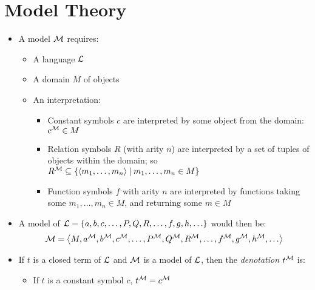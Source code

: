 \newpage

\section{Model Theory}

\begin{itemize}
	
	\item A model $ \mathcal{M} $ requires:
	
	\begin{itemize}
		
		\item A language $ \mathcal{L} $
		
		\item A domain $ M $ of objects
		
		\item An interpretation:
		
		\begin{itemize}
			
			\item Constant symbols $ c $ are interpreted by some object from the domain: $ c^{\mathcal{M}} \in M $
			
			\item Relation symbols $ R $ (with arity $ n $) are interpreted by a set of tuples of objects within the domain; so $ R^{\mathcal{M}} \subseteq \left\lbrace \left\langle m_1, \dots, m_n \right\rangle \, | \, m_1, \dots, m_n \in M \right\rbrace $
			
			\item Function symbols $ f $ with arity $ n $ are interpreted by functions taking some $ m_1, \dots, m_n \in M$, and returning some $ m \in M $
			
		\end{itemize}
		
	\end{itemize}

	\item A model of $ \Lang = \set{a, b, c, \dots, P, Q, R, \dots, f, g, h, \dots} $ would then be:
	\begin{equation*}
	\Model = \tuple{M, a^\Model, b^\Model, c^\Model, \dots, P^\Model, Q^\Model, R^\Model, \dots, f^\Model, g^\Model, h^\Model, \dots}
	\end{equation*}
	
	\item If $ t $ is a closed term of $ \mathcal{L} $ and $ \mathcal{M} $ is a model of $ \mathcal{L} $, then the \textit{denotation} $ t^{\mathcal{M}} $ is:
	
	\begin{itemize}
		\item If $ t $ is a constant symbol $ c $, $ t^{\mathcal{M}} = c^{\mathcal{M}} $
		

\end{itemize}
\end{itemize}
